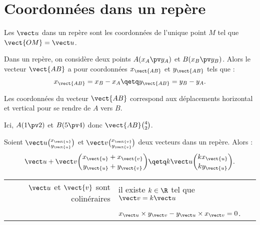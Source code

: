 \documentclass[10pt,openright,twoside,french]{book}
\begin{document}
\section{Coordonnées dans un repère}

\begin{Defi}
    Les  $\vect u$ dans un repère \OIJ sont les coordonnées de l'unique point $M$ tel que $\vect{OM} = \vect u$.
\end{Defi}

\begin{Prop}
    Dans un repère, on considère deux points $A(x_A \pv y_A)$ et $B(x_B \pv y_B)$. Alors le vecteur $\vect{AB}$ a pour coordonnées $x_{\vect{AB}}$ et $y_{\vect{AB}}$ tels que :
    \[x_{\vect{AB}} = x_B - x_A \qetq y_{\vect{AB}} = y_B - y_A.\]
\end{Prop}

\begin{Rmq}
    Les coordonnées du vecteur $\vect{AB}$ correspond aux déplacements horizontal et vertical pour se rendre de $A$ vers $B$.
\end{Rmq}

\begin{center}
    
    Ici, $A(1\pv2)$ et $B(5 \pv 4)$ donc $\vect{AB} \binom 42$.
\end{center}

\begin{Prop}
    Soient $\vect u\binom{x_{\vect{u}}}{y_{\vect{u}}}$ et $\vect v\binom{x_{\vect{v}}}{y_{\vect{v}}}$ deux vecteurs dans un repère. Alors :
    \[\vect u + \vect v\binom{x_{\vect{u}}+x_{\vect{v}}}{y_{\vect{u}}+y_{\vect{v}}} \qetq k\vect u\binom{kx_{\vect{u}}}{ky_{\vect{u}}}.\]
\end{Prop}

\begin{Prop}
    \begin{tabular}{r@{$\quad\Leftrightarrow \quad$}l}
        $\vect u$ et $\vect{v}$ sont colinéraires & il existe $k \in \R$ tel que $\vect v = k\vect u$\\
                                                                      & $x_{\vect u} \times y_{\vect v} - y_{\vect u} \times x_{\vect v} = 0$.
    \end{tabular}
\end{Prop}
\end{document}
